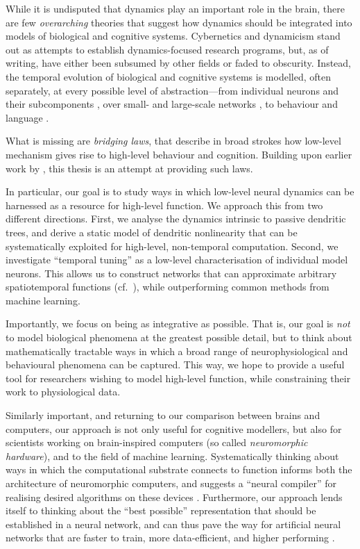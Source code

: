 While it is undisputed that dynamics play an important role in the brain, there are few \emph{overarching} theories that suggest how dynamics should be integrated into models of biological and cognitive systems.
Cybernetics \citep{wiener1948cybernetics} and dynamicism \citep{vangelder1998dynamical,eliasmith1996third} stand out as attempts to establish dynamics-focused research programs, but, as of writing, have either been subsumed by other fields or faded to obscurity.
Instead, the temporal evolution of biological and cognitive systems is modelled, often separately, at every possible level of abstraction---from individual neurons and their subcomponents \citep[e.g.,][]{gerstner2002spiking,izhikevich2007dynamical}, over small- and large-scale networks \citep[e.g.,][]{gerstner2014neuronal,bassett2017network}, to behaviour and language \citep[e.g.,][]{anderson1997actr,debot2007dynamic}.

What is missing are \emph{bridging laws}, that describe in broad strokes how low-level mechanism gives rise to high-level behaviour and cognition.
Building upon earlier work by \citet{eliasmith2003neural}, this thesis is an attempt at providing such laws.

In particular, our goal is to study ways in which low-level neural dynamics can be harnessed as a resource for high-level function.
We approach this from two different directions.
First, we analyse the dynamics intrinsic to passive dendritic trees, and derive a static model of dendritic nonlinearity that can be systematically exploited for high-level, non-temporal computation.
Second, we investigate \enquote{temporal tuning} as a low-level characterisation of individual model neurons.
This allows us to construct networks that can approximate arbitrary spatiotemporal functions (cf.~), while outperforming common methods from machine learning.

Importantly, we focus on being as integrative as possible.
That is, our goal is \emph{not} to model biological phenomena at the greatest possible detail, but to think about mathematically tractable ways in which a broad range of neurophysiological and behavioural phenomena can be captured.
This way, we hope to provide a useful tool for researchers wishing to model high-level function, while constraining their work to physiological data.

Similarly important, and returning to our comparison between brains and computers, our approach is not only useful for cognitive modellers, but also for scientists working on brain-inspired computers (so called \emph{neuromorphic hardware}), and to the field of machine learning.
Systematically thinking about ways in which the computational substrate connects to function informs both the architecture of neuromorphic computers, and suggests a \enquote{neural compiler} for realising desired algorithms on these devices \citep{boahen2017neuromorph,voelker2021programming}.
Furthermore, our approach lends itself to thinking about the \enquote{best possible} representation that should be established in a neural network, and can thus pave the way for artificial neural networks that are faster to train, more data-efficient, and higher performing \citep{voelker2019lmu,chilkuri2021parallelizing}.

